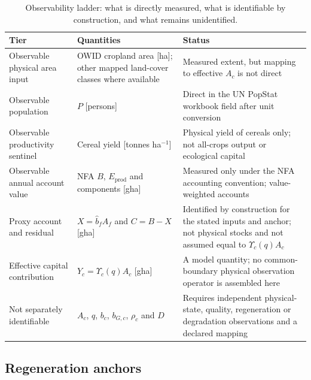 \documentclass[11pt,a4paper]{article}
\newcommand{\Ups}{\Upsilon_c}
\begin{document}
\begin{table}[htbp]
\centering\small
\caption{Observability ladder: what is directly measured, what is identifiable by construction, and what remains unidentified.}
\label{tab:si_ladder}
\begin{tabularx}{\textwidth}{>{\raggedright\arraybackslash}p{} X >{\raggedright\arraybackslash}p{}}
\toprule
Tier & Quantities & Status \\
\midrule
Observable physical area input & OWID cropland area [ha]; other mapped land-cover classes where available & Measured extent, but mapping to effective $A_c$ is not direct \\
Observable population & $P$ [persons] & Direct in the UN PopStat workbook field after unit conversion \\
Observable productivity sentinel & Cereal yield [tonnes ha$^{-1}$] & Physical yield of cereals only; not all-crops output or ecological capital \\
Observable annual account value & NFA $B$, $E_{\mathrm{prod}}$ and components [gha] & Measured only under the NFA accounting convention; value-weighted accounts \\
Proxy account and residual & $X=\hat b_fA_f$ and $C=B-X$ [gha] & Identified by construction for the stated inputs and anchor; not physical stocks and not assumed equal to $\Ups(q)A_c$ \\
Effective capital contribution & $Y_c=\Ups(q)A_c$ [gha] & A model quantity; no common-boundary physical observation operator is assembled here \\
Not separately identifiable & $A_c$, $q$, $b_c$, $b_{G,c}$, $\rho_c$ and $D$ & Requires independent physical-state, quality, regeneration or degradation observations and a declared mapping \\
\bottomrule
\end{tabularx}
\end{table}

\subsection{Regeneration anchors}\label{si:anchors}
\end{document}
